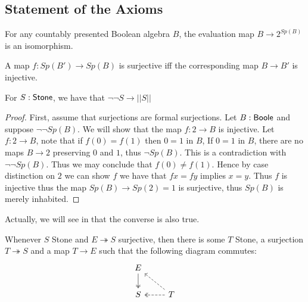 
\subsection{Statement of the Axioms}
\begin{axiomNum}
  For any countably presented Boolean algebra $B$, the evaluation map $B\rightarrow  2^{Sp(B)}$ is an isomorphism.
\end{axiomNum} 



\begin{axiomNum}
  A map $f:Sp(B')\to Sp(B)$ is surjective iff the corresponding map $B \to B'$ is injective.
\end{axiomNum} 

\begin{lemma}\label{LemSurjectionsFormalToCompleteness}
 For $S:\mathsf{Stone}$, we have that $\neg \neg S \to || S ||$
\end{lemma}
\begin{proof}
  First, assume that surjections are formal surjections. 
  Let $B:\mathsf{Boole}$ and suppose $\neg \neg Sp(B)$. 
  We will show that the map $f:2\to B$ is injective. 
  Let $f:2 \to B$, note that if $f(0) = f(1)$ then $0=1$ in $B$, 
  If $0=1$ in $B$, there are no maps $B\to 2$ preserving $0$ and $1$, thus $\neg Sp(B)$. 
  This is a contradiction with $\neg \neg Sp(B)$. Thus we may conclude that $f(0)\neq f(1)$. 
  Hence by case distinction on $2$ we can show $f$ we have that $f x = f y$ implies $ x= y$. Thus 
  $f$ is injective thus the map $Sp(B) \to Sp(2) = 1$ is surjective, thus $Sp(B)$ is merely inhabited. 
\end{proof} 
Actually, we will see in  that the converse is also true. 

\begin{axiomNum}
  Whenever $S$ Stone and $E\twoheadrightarrow S$ surjective, then there is some $T$ Stone,
    a surjection $T \twoheadrightarrow S$ and a map $T\to E$ 
    such that the following diagram commutes:
    \begin{equation}\begin{tikzcd}
      E \arrow[d,""',two heads]\\
      S & \arrow[l, "", two heads, dashed] T\arrow[lu, ""',dashed ]
    \end{tikzcd}\end{equation}  
\end{axiomNum} 


